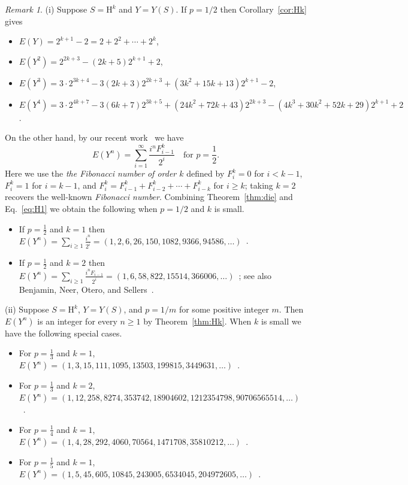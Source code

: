 \documentclass[10pt]{amsart}
\theoremstyle{definition}
\theoremstyle{remark}
\newtheorem{remark}[theorem]{Remark}
\newcommand{\HH}{\mathrm{H}} \newcommand{\TT}{\mathrm{T}}
\begin{document}
\begin{remark}
(i) Suppose $S=\HH^k$ and $Y=Y(S)$. 
If $p=1/2$ then Corollary~\ref{cor:Hk} gives 
\begin{itemize}
\item $E(Y) = 2^{k+1}-2 = 2 + 2^2 + \cdots + 2^k$,
\item $E(Y^2) = 2^{2k+3} - (2k+5) 2^{k+1} + 2$, 
\item $E(Y^3) = 3\cdot2^{3k+4} - 3(2k+3)2^{2k+3} + (3k^2+15k+13)2^{k+1} - 2$,
\item $E(Y^4) = 3\cdot2^{4k+7} - 3(6k+7)2^{3k+5} + (24k^2+72k+43)2^{2k+3} - (4k^3+30k^2+52k+29)2^{k+1} + 2$. 
\end{itemize}
On the other hand, by our recent work~\cite[Proposition~3.2]{Huang} we have
\begin{equation}\label{eq:H1}
E(Y^n) = \sum_{i=1}^\infty \frac{i^n F_{i-1}^k}{2^i} \quad\text{for } p = \frac12.
\end{equation} 
Here we use the \emph{the Fibonacci number of order $k$} defined by $F_i^k = 0$ for $i<k-1$, $F_i^k=1$ for $i=k-1$, and $F_i^k = F_{i-1}^k + F_{i-2}^k + \cdots + F_{i-k}^k$ for $i\ge k$; taking $k=2$ recovers the well-known \emph{Fibonacci number}.
Combining Theorem~\ref{thm:die} and Eq.~\eqref{eq:H1} we obtain the following when $p=1/2$ and $k$ is small.
\begin{itemize}
\item
If $p=\frac12$ and $k=1$ then $E(Y^n) = \sum_{i\ge1} \frac{i^n}{2^i} = (1, 2, 6, 26, 150, 1082, 9366, 94586, \ldots)$~\cite[A000629]{OEIS}.
\item
If $p=\frac12$ and $k=2$ then $E(Y^n) = \sum_{i\ge1} \frac{i^nF_{i-1}}{2^i} = (1,6, 58, 822, 15514, 366006, \ldots)$~\cite[A302922]{OEIS}; see also Benjamin, Neer, Otero, and Sellers~\cite{ProbFibSum}.
\end{itemize}

(ii) Suppose $S=\HH^k$, $Y=Y(S)$, and $p=1/m$ for some positive integer $m$.
Then $E(Y^n)$ is an integer for every $n\ge1$ by Theorem~\ref{thm:Hk}.
When $k$ is small we have the following special cases.
\begin{itemize}
\item
For $p=\frac13$ and $k=1$, $E(Y^n) = (1, 3, 15, 111, 1095, 13503, 199815, 3449631, \ldots)$~\cite[A201339]{OEIS}.
\item
For $p=\frac13$ and $k=2$, $E(Y^n) = (1, 12, 258, 8274, 353742, 18904602, 1212354798, 90706565514, \ldots)$~\cite[A352971]{OEIS}.
\item
For $p=\frac14$ and $k=1$, $E(Y^n) = (1, 4, 28, 292, 4060, 70564, 1471708, 35810212, \ldots)$~\cite[A201354]{OEIS}.
\item
For $p=\frac15$ and $k=1$, $E(Y^n) = (1, 5, 45, 605, 10845, 243005, 6534045, 204972605,\ldots)$~\cite[A201365]{OEIS}.
\end{itemize}
\end{remark}
\end{document}
